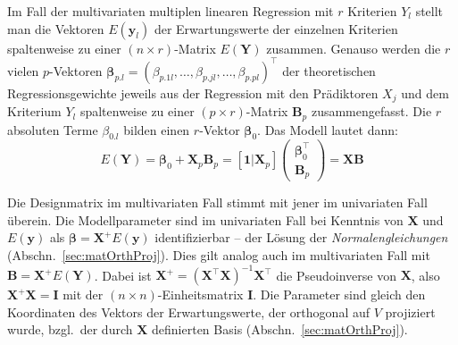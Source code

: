 Im Fall der multivariaten multiplen linearen Regression mit $r$ Kriterien $Y_{l}$ stellt man die Vektoren $E(\bm{y}_{l})$ der Erwartungswerte der einzelnen Kriterien spaltenweise zu einer $(n \times r)$-Matrix $E(\bm{Y})$ zusammen. Genauso werden die $r$ vielen $p$-Vektoren $\bm{\beta}_{p.l} = (\beta_{p.1l}, \ldots, \beta_{p.jl}, \ldots, \beta_{p.pl})^{\top}$ der theoretischen Regressionsgewichte jeweils aus der Regression mit den Prädiktoren $X_{j}$ und dem Kriterium $Y_{l}$ spaltenweise zu einer $(p \times r)$-Matrix $\bm{B}_{p}$ zusammengefasst. Die $r$ absoluten Terme $\beta_{0.l}$ bilden einen $r$-Vektor $\bm{\beta}_{0}$. Das Modell lautet dann:
\begin{equation*}
E(\bm{Y}) = \bm{\beta}_{0} + \bm{X}_{p} \bm{B}_{p} =
[\bm{1}|\bm{X}_{p}] \left(\begin{array}{c} \bm{\beta}_{0}^{\top} \\ \bm{B}_{p} \end{array}\right) =
\bm{X}\bm{B}
\end{equation*}

Die Designmatrix im multivariaten Fall stimmt mit jener im univariaten Fall überein. Die Modellparameter sind im univariaten Fall bei Kenntnis von $\bm{X}$ und $E(\bm{y})$ als $\bm{\beta} = \bm{X}^{+} E(\bm{y})$ identifizierbar -- der Lösung der \emph{Normalengleichungen} (Abschn.\ \ref{sec:matOrthProj}). Dies gilt analog auch im multivariaten Fall mit $\bm{B} = \bm{X}^{+} E(\bm{Y})$. Dabei ist $\bm{X}^{+} = (\bm{X}^{\top} \bm{X})^{-1} \bm{X}^{\top}$ die Pseudoinverse von $\bm{X}$, also $\bm{X}^{+} \bm{X} = \bm{I}$ mit der $(n \times n)$-Einheitsmatrix $\bm{I}$. Die Parameter sind gleich den Koordinaten des Vektors der Erwartungswerte, der orthogonal auf $V$ projiziert wurde, bzgl.\ der durch $\bm{X}$ definierten Basis (Abschn.\ \ref{sec:matOrthProj}).

